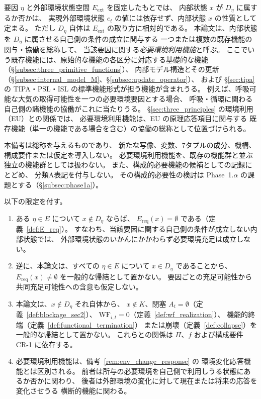 \begin{remark}[必要環境利用機能]
\label{rem:env_utilization_function}
要因 $\eta$ と外部環境状態空間 $E_{\mathrm{ext}}$ を固定したもとでは、
内部状態 $x$ が $D_\eta$ に属するか否かは、
実現外部環境状態 $e_t$ の値には依存せず、内部状態 $x$ の性質として定まる。
ただし $D_\eta$ 自体は $E_{\mathrm{ext}}$ の取り方に相対的である。
本論文は、内部状態を $D_\eta$ に属させる自己側の条件の成立に関与する
一つまたは複数の既存機能の関与・協働を総称して、
当該要因に関する\emph{必要環境利用機能}と呼ぶ。
ここでいう既存機能には、原始的な機能の各区分に対応する基礎的な機能
（\S\ref{subsec:three_primitive_functions}）、
内部モデル構造とその更新
（\S\ref{subsec:internal_model_M}、\S\ref{subsec:update_operator}）、
および \S\ref{sec:tipa} の TIPA・PSL・ISL の標準機能形式が担う機能が含まれうる。
例えば、呼吸可能な大気の取得可能性を一つの必要環境要因とする場合、
呼吸・循環に関わる自己側の諸機能の協働がこれに当たりうる。
\S\ref{sec:three_principles} の環境利用（EU）との関係では、
必要環境利用機能は、EU の原理応答項目に関与する
既存機能（単一の機能である場合を含む）の協働の総称として位置づけられる。

本備考は総称を与えるものであり、
新たな写像、変数、7タプルの成分、機構、構成要件または仮定を導入しない。
必要環境利用機能を、既存の機能群と並ぶ独立の機能群としては扱わない。
また、構成的必要機能の候補としての記録にとどめ、
分類A表記を付与しない。
その構成的必要性の検討は Phase~1.$\alpha$ の課題とする（\S\ref{subsec:phase1a}）。

以下の限定を付す。

\begin{enumerate}[label=(\alph*)]
  \item ある $\eta\in E$ について $x\notin D_\eta$ ならば、
  $E_{\mathrm{req}}(x)=\emptyset$ である（定義~\ref{def:E_req}）。
  すなわち、当該要因に関する自己側の条件が成立しない内部状態では、
  外部環境状態のいかんにかかわらず必要環境充足は成立しない。
  \item 逆に、本論文は、すべての $\eta\in E$ について $x\in D_\eta$ であることから、
  $E_{\mathrm{req}}(x)\neq\emptyset$ を一般的な帰結として置かない。
  要因ごとの充足可能性から共同充足可能性への含意も仮定しない。
  \item 本論文は、$x\notin D_\eta$ それ自体から、
  $x\notin K$、閉塞 $A_t=\emptyset$（定義~\ref{def:blockage_sec2}）、
  $\mathrm{WF}_{i,t}=0$（定義~\ref{def:wf_realization}）、
  機能的終端（定義~\ref{def:functional_termination}）
  または崩壊（定義~\ref{def:collapse}）を一般的な帰結として置かない。
  これらとの関係は $\Pi$、$f$ および構成要件 CR-1 に依存する。
  \item 必要環境利用機能は、備考~\ref{rem:env_change_response} の
  環境変化応答機能とは区別される。
  前者は所与の必要環境を自己側で利用しうる状態にあるか否かに関わり、
  後者は外部環境の変化に対して現在または将来の応答を変化させうる
  横断的機能に関わる。
\end{enumerate}
\end{remark}

